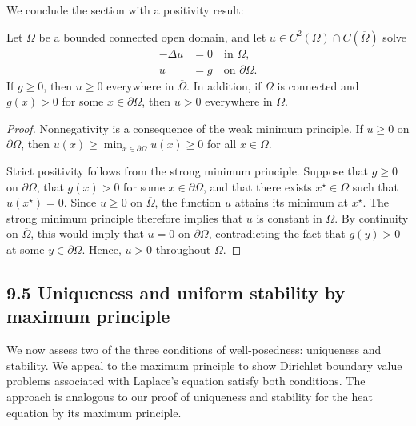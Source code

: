 We conclude the section with a positivity result:

\begin{corollary}[Positivity][9.12]
    Let $\Omega$ be a bounded connected open domain, and let $u \in C^2(\Omega) \cap C(\overline{\Omega})$ solve
    \begin{align*}
        -\Delta u &= 0 \quad \text{in } \Omega, \\
        u &= g \quad \text{on } \partial\Omega.
    \end{align*}
    If $g \geq 0$, then $u \geq 0$ everywhere in $\overline{\Omega}$. In addition, if $\Omega$ is connected and $g(x) > 0$ for some $x \in \partial\Omega$, then $u > 0$ everywhere in $\Omega$.
\end{corollary}
\begin{proof}
    Nonnegativity is a consequence of the weak minimum principle. If $u \geq 0$ on $\partial\Omega$, then $u(x) \geq \min_{x \in \partial\Omega} u(x) \geq 0$ for all $x \in \overline{\Omega}$.

    Strict positivity follows from the strong minimum principle. Suppose that $g \geq 0$ on $\partial\Omega$, that $g(x) > 0$ for some $x \in \partial\Omega$, and that there exists $x^\star \in \Omega$ such that $u(x^\star) = 0$. Since $u \geq 0$ on $\overline{\Omega}$, the function $u$ attains its minimum at $x^\star$. The strong minimum principle therefore implies that $u$ is constant in $\Omega$. By continuity on $\overline{\Omega}$, this would imply that $u = 0$ on $\partial\Omega$, contradicting the fact that $g(y) > 0$ at some $y \in \partial\Omega$. Hence, $u > 0$ throughout $\Omega$.
\end{proof}

\subsection{9.5 Uniqueness and uniform stability by maximum principle}
We now assess two of the three conditions of well-posedness: uniqueness and stability. We appeal to the maximum principle to show Dirichlet boundary value problems associated with Laplace's equation satisfy both conditions. The approach is analogous to our proof of uniqueness and stability for the heat equation by its maximum principle.

